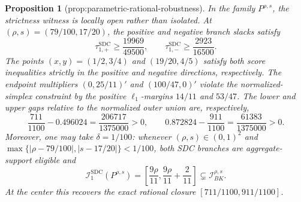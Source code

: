\documentclass{article}
\newtheorem{proposition}{Proposition}
\begin{document}
\begin{proposition}[prop:parametric-rational-robustness]\label{prop:parametric-rational-robustness}
In the family \(P^{\rho,s}\), the strictness witness is locally open rather than isolated.  At \((\rho,s)=(79/100,17/20)\), the positive and negative branch slacks satisfy
\[
 \tau_{1,+}^{\mathrm{SDC}}\geq\frac{19969}{49500},
 \qquad
 \tau_{1,-}^{\mathrm{SDC}}\geq\frac{2923}{16500}.
\]
The points \((x,y)=(1/2,3/4)\) and \((19/20,4/5)\) satisfy both score inequalities strictly in the positive and negative directions, respectively.  The endpoint multipliers \((0,25/11)'\) and \((100/47,0)'\) violate the normalized-simplex constraint by the positive \(\ell_1\)-margins \(14/11\) and \(53/47\).  The lower and upper gaps relative to the normalized outer union are, respectively,
\[
 \frac{711}{1100}-0.496024=\frac{206717}{1375000}>0,
 \qquad
 0.872824-\frac{911}{1100}=\frac{61383}{1375000}>0.
\]
Moreover, one may take \(\delta=1/100\): whenever \((\rho,s)\in(0,1)^2\) and
\(\max\{|\rho-79/100|,|s-17/20|\}<1/100\), both SDC branches are aggregate-support eligible and
\[
 \mathcal I_1^{\mathrm{SDC}}(P^{\rho,s})
 =\left[\frac{9\rho}{11},\frac{9\rho}{11}+\frac{2}{11}\right]
 \subsetneq \mathcal I_{BK}^{\rho,s}.
\]
At the center this recovers the exact rational closure \([711/1100,911/1100]\).
\end{proposition}
\end{document}
